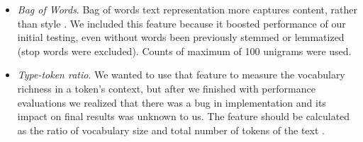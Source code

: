 \documentclass[10pt, a4paper]{article}
\begin{document}
\begin{itemize}
	\item \textit{Bag of Words}. Bag of words text representation more captures content, rather than style \citep{stamatatos-2009a}. We included this feature because it boosted performance of our initial testing, even without words been previously stemmed or lemmatized (stop words were excluded). Counts of maximum of 100 unigrams were used.
	\item \textit{Type-token ratio}. We wanted to use that feature to measure the vocabulary richness in a token's context, but after we finished with performance evaluations we realized that there was a bug in implementation and its impact on final results was unknown to us. The feature should be calculated as the ratio of vocabulary size and total number of tokens of the text \citep{stamatatos-2009a}.
\end{itemize}
\end{document}
